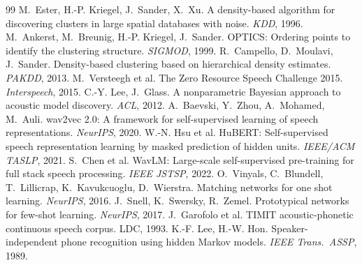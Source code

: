 \documentclass[11pt]{article}
\begin{document}
\begin{thebibliography}{99}
\small
{} M.~Ester, H.-P. Kriegel, J.~Sander, X.~Xu.
A density-based algorithm for discovering clusters in large spatial databases
with noise. \emph{KDD}, 1996.
 M.~Ankerst, M.~Breunig, H.-P. Kriegel, J.~Sander.
OPTICS: Ordering points to identify the clustering structure.
\emph{SIGMOD}, 1999.
 R.~Campello, D.~Moulavi, J.~Sander.
Density-based clustering based on hierarchical density estimates.
\emph{PAKDD}, 2013.
 M.~Versteegh et al.
The Zero Resource Speech Challenge 2015. \emph{Interspeech}, 2015.
 C.-Y. Lee, J.~Glass.
A nonparametric Bayesian approach to acoustic model discovery. \emph{ACL}, 2012.
 A.~Baevski, Y.~Zhou, A.~Mohamed, M.~Auli.
wav2vec 2.0: A framework for self-supervised learning of speech
representations. \emph{NeurIPS}, 2020.
 W.-N. Hsu et al.
HuBERT: Self-supervised speech representation learning by masked prediction of
hidden units. \emph{IEEE/ACM TASLP}, 2021.
 S.~Chen et al.
WavLM: Large-scale self-supervised pre-training for full stack speech
processing. \emph{IEEE JSTSP}, 2022.
 O.~Vinyals, C.~Blundell, T.~Lillicrap, K.~Kavukcuoglu,
D.~Wierstra. Matching networks for one shot learning. \emph{NeurIPS}, 2016.
 J.~Snell, K.~Swersky, R.~Zemel.
Prototypical networks for few-shot learning. \emph{NeurIPS}, 2017.
 J.~Garofolo et al.
TIMIT acoustic-phonetic continuous speech corpus. LDC, 1993.
 K.-F. Lee, H.-W. Hon.
Speaker-independent phone recognition using hidden Markov models.
\emph{IEEE Trans.\ ASSP}, 1989.
\end{thebibliography}
\end{document}
